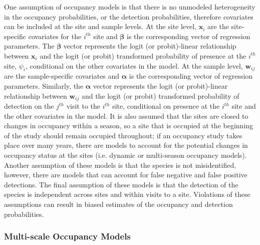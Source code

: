 \documentclass[12pt]{article}\usepackage[]{graphicx}\usepackage[]{color}
\begin{document}
One assumption of occupancy models is that there is no unmodeled heterogeneity in the occupancy probabilities, or the detection probabilities, therefore covariates can be included at the site and sample levels. At the site level, $\bm{x}_i$ are the site-specific covariates for the $i^{th}$ site and $\bm{\beta}$ is the corresponding vector of regression parameters. The $\bm\beta$ vector represents the logit (or probit)-linear relationship between $\bm{x}_i$ and the logit (or probit) transformed probability of presence at the $i^{th}$ site, $\psi_i$, conditional on the other covariates in the model. At the sample level, $\bm{w}_{ij}$ are the sample-specific covariates and $\bm{\alpha}$ is the corresponding vector of regression parameters. Similarly, the $\bm\alpha$ vector represents the logit (or probit)-linear relationship between $\bm{w}_{ij}$ and the logit (or probit) transformed probability of detection on the $j^{th}$ visit to the $i^{th}$ site, conditional on presence at the $i^{th}$ site and the other covariates in the model. It is also assumed that the sites are closed to changes in occupancy within a season, so a site that is occupied at the beginning of the study should remain occupied throughout; if an occupancy study takes place over many years, there are models to account for the potential changes in occupancy status at the sites (i.e. dynamic or multi-season occupancy models). Another assumption of these models is that the species is not misidentified, however, there are models that can account for false negative and false positive detections. The final assumption of these models is that the detection of the species is independent across sites and within visits to a site. Violations of these assumptions can result in biased estimates of the occupancy and detection probabilities. 

\subsubsection{Multi-scale Occupancy Models}
\end{document}
